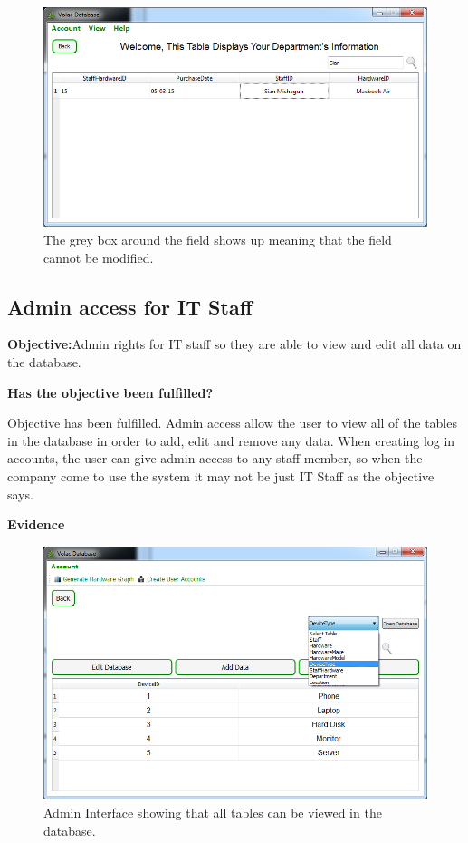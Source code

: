 \begin{figure}[H]
    \includegraphics[width=\textwidth]{./Evaluation/Images/readonlymanager.png}
    \caption{The grey box around the field shows up meaning that the field cannot be modified.} 
\end{figure}




\subsection{Admin access for IT Staff}\label{admin}

\textbf{Objective:}Admin rights for IT staff so they are able to view and edit all data on the database.

\textbf{Has the objective been fulfilled?}

Objective has been fulfilled. Admin access allow the user to  view all of the tables in the database in order to add, edit and remove any data. When creating log in accounts, the user can give admin access to any staff member, so when the company come to use the system it may not be just IT Staff as the objective says.

\textbf{Evidence}

\begin{figure}[H]
    \includegraphics[width=\textwidth]{./Evaluation/Images/admin1.png}
    \caption{Admin Interface showing that all tables can be viewed in the database.} 
\end{figure}

